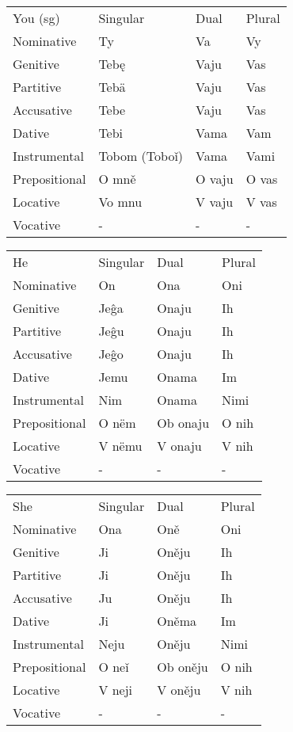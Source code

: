 \begin{table}[!htb]
	\begin{tabular}{llll}
		You (sg) & Singular & Dual & Plural \\
		Nominative & Ty & Va & Vy \\
		Genitive & Tebę & Vaju & Vas \\
		Partitive & Tebä & Vaju & Vas \\
		Accusative & Tebe & Vaju & Vas \\
		Dative & Tebi & Vama & Vam \\
		Instrumental & Tobom (Toboǐ) & Vama & Vami \\
		Prepositional & O mně & O vaju & O vas \\
		Locative & Vo mnu & V vaju & V vas \\
		Vocative & - & - & -
	\end{tabular}
\end{table}

\begin{table}[!htb]
	\begin{tabular}{llll}
		He & Singular & Dual & Plural \\
		Nominative & On & Ona & Oni \\
		Genitive & Jeĝa & Onaju & Ih \\
		Partitive & Jeĝu & Onaju & Ih \\
		Accusative & Jeĝo & Onaju & Ih \\
		Dative & Jemu & Onama & Im \\
		Instrumental & Nim & Onama & Nimi \\
		Prepositional & O nëm & Ob onaju & O nih \\
		Locative & V nëmu & V onaju & V nih \\
		Vocative & - & - & -
	\end{tabular}
\end{table}

\begin{table}[!htb]
	\begin{tabular}{llll}
		She & Singular & Dual & Plural \\
		Nominative & Ona & Oně & Oni \\
		Genitive & Ji & Oněju & Ih \\
		Partitive & Ji & Oněju & Ih \\
		Accusative & Ju & Oněju & Ih \\
		Dative & Ji & Oněma & Im \\
		Instrumental & Neju & Oněju & Nimi \\
		Prepositional & O neǐ & Ob oněju & O nih \\
		Locative & V neji & V oněju & V nih \\
		Vocative & - & - & -
	\end{tabular}
\end{table}

